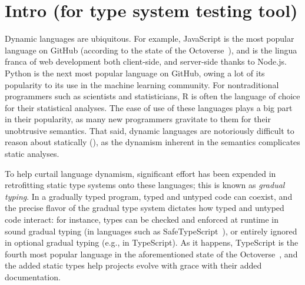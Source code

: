 \section{Intro (for type system testing tool)}

Dynamic languages are ubiquitous.
For example, JavaScript is the most popular language on GitHub (according to the state of the Octoverse~\cite{state-of-octoverse-2021}), and is the lingua franca of web development both client-side, and server-side thanks to Node.js.
Python is the next most popular language on GitHub, owing a lot of its popularity to its use in the machine learning community.
For nontraditional programmers such as scientists and statisticians, R is often the language of choice for their statistical analyses.
The ease of use of these languages plays a big part in their popularity, as many new programmers gravitate to them for their unobtrusive semantics.
That said, dynamic languages are notoriously difficult to reason about statically (), as the dynamism inherent in the semantics complicates static analyses.

To help curtail language dynamism, significant effort has been expended in retrofitting static type systems onto these languages; this is known as \textit{gradual typing}.
In a gradually typed program, typed and untyped code can coexist, and the precise flavor of the gradual type system dictates how typed and untyped code interact: for instance, types can be checked and enforced at runtime in sound gradual typing (in languages such as SafeTypeScript~\cite{rastogi2015safe}), or entirely ignored in optional gradual typing (e.g., in TypeScript).
As it happens, TypeScript is the fourth most popular language in the aforementioned state of the Octoverse~\cite{state-of-octoverse-2021}, and the added static types help projects evolve with grace with their added documentation.

